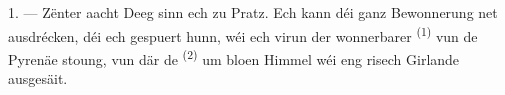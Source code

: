 %
%
%
%

\VUsaut{4.0mm}
\VUsaut{3.0mm}

\VUsaut{3.0mm}

\VUsaut{3.0mm}

1. --- Zënter aacht Deeg sinn ech zu Pratz. Ech kann déi ganz Bewonnerung net
ausdrécken, déi ech gespuert hunn, wéi ech virun der wonnerbarer
 \textsuperscript{(1)} vun de Pyrenäe stoung, vun där de
 \textsuperscript{(2)} um bloen Himmel wéi eng risech Girlande ausgesäit.

